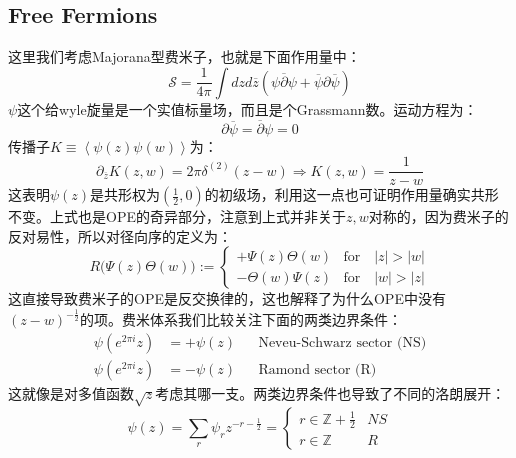 \subsection{Free Fermions}
这里我们考虑Majorana型费米子，也就是下面作用量中：
\begin{equation}
	\mathcal{S}=\frac1{4\pi}\int dzd\overline{z}\left(\psi\overline{\partial}\psi+\overline{\psi}\partial\overline{\psi}\right)
\end{equation}
$\psi$这个给wyle旋量是一个实值标量场，而且是个Grassmann数。运动方程为：
\begin{equation}\label{35.39}
	\partial\overline{\psi}=\overline{\partial}\psi=0
\end{equation}
传播子$K\equiv\left\langle\psi(z)\psi(w)\right\rangle$为：
\begin{equation}
	\partial_{\overline{z}}K(z,w)=2\pi\delta^{(2)}(z-w)\Rightarrow K(z,w)=\frac{1}{z-w}
\end{equation}
这表明$\psi(z)$是共形权为$(\frac{1}{2},0)$的初级场，利用这一点也可证明作用量确实共形不变。上式也是OPE的奇异部分，注意到上式并非关于$z,w$对称的，因为费米子的反对易性，所以对径向序的定义为：
\begin{equation}
	R\big(\Psi(z)\Theta(w)\big):=
	\begin{cases}+\Psi(z)\Theta(w)&\mathrm{for}\quad|z|>|w|\\-\Theta(w)\Psi(z)&\mathrm{for}\quad|w|>|z|\end{cases}
\end{equation}
这直接导致费米子的OPE是反交换律的，这也解释了为什么OPE中没有$(z-w)^{-\frac{1}{2}}$的项。费米体系我们比较关注下面的两类边界条件：
\begin{equation}
	\begin{aligned}\psi(e^{2\pi i}z)&=+\psi(z)&&\text{Neveu-Schwarz sector (NS)}\\\psi(e^{2\pi i}z)&=-\psi(z)&&\text{Ramond sector (R)}\end{aligned}
\end{equation}
这就像是对多值函数$\sqrt{z}$考虑其哪一支。两类边界条件也导致了不同的洛朗展开：
\begin{equation}
	\psi(z)=\sum_r\psi_rz^{-r-\frac12}=\begin{cases}r\in\mathbb{Z}+\frac1{2}&NS\\r\in\mathbb{Z}&R\end{cases}
\end{equation}
